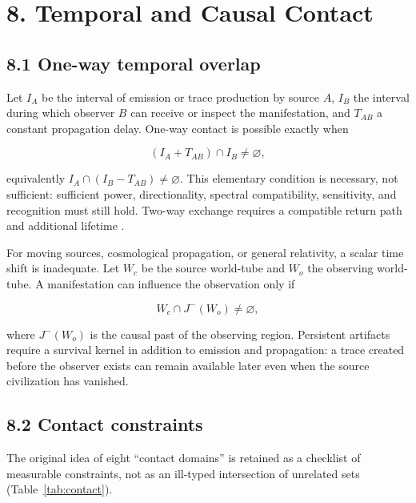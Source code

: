 \documentclass[11pt,a4paper]{article}
\begin{document}
\section{8. Temporal and Causal Contact}\label{8-temporal-and-causal-contact}

\subsection{8.1 One-way temporal overlap}\label{81-one-way-temporal-overlap}

Let \(I_A\) be the interval of emission or trace production by source \(A\), \(I_B\) the interval during which observer \(B\) can receive or inspect the manifestation, and \(T_{AB}\) a constant propagation delay. One-way contact is possible exactly when

\begin{equation}
(I_A+T_{AB})\cap I_B\ne\varnothing,
\end{equation}

equivalently \(I_A\cap(I_B-T_{AB})\ne\varnothing\). This elementary condition is necessary, not sufficient: sufficient power, directionality, spectral compatibility, sensitivity, and recognition must still hold. Two-way exchange requires a compatible return path and additional lifetime \citep{horvat2011,grimaldi2018}.

For moving sources, cosmological propagation, or general relativity, a scalar time shift is inadequate. Let \(W_c\) be the source world-tube and \(W_o\) the observing world-tube. A manifestation can influence the observation only if

\begin{equation}
W_c\cap J^-(W_o)\ne\varnothing,
\end{equation}

where \(J^-(W_o)\) is the causal past of the observing region. Persistent artifacts require a survival kernel in addition to emission and propagation: a trace created before the observer exists can remain available later even when the source civilization has vanished.

\subsection{8.2 Contact constraints}\label{82-contact-constraints}

The original idea of eight ``contact domains'' is retained as a checklist of measurable constraints, not as an ill-typed intersection of unrelated sets (Table~\ref{tab:contact}).
\end{document}
